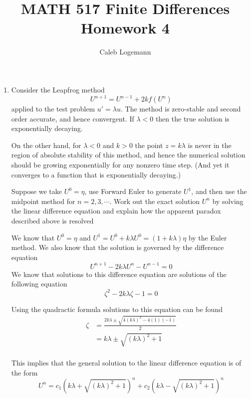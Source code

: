 \documentclass[11pt, oneside, titlepage]{article}
\title{MATH 517 Finite Differences Homework 4}
\author{Caleb Logemann}
\begin{document}
\maketitle

%
\begin{enumerate}
    \item %
        Consider the Leapfrog method
        \[
            U^{n+1} = U^{n-1} + 2k f(U^n)
        \]
        applied to the test problem $u′ = \lambda u$.
        The method is zero-stable and second order accurate, and hence convergent.
        If $\lambda < 0$ then the true solution is exponentially decaying.

        On the other hand, for $\lambda < 0$ and $k > 0$ the point $z = k\lambda$ is never in the
        region of absolute stability of this method,
        and hence the numerical solution should be growing exponentially for any
        nonzero time step.
        (And yet it converges to a function that is exponentially decaying.)

        Suppose we take $U^0 = \eta$, use Forward Euler to generate $U^1$, and
        then use the midpoint method for $n = 2, 3, \cdots$.
        Work out the exact solution $U^n$ by solving the linear difference
        equation and explain how the apparent paradox described above is resolved

        We know that $U^0 = \eta$ and
        $U^1 = U^0 + k \lambda U^0 = (1 + k\lambda)\eta$ by the Euler method.
        We also know that the solution is governed by the difference equation
        \[
            U^{n+1} - 2k\lambda U^n - U^{n-1} = 0
        \]
        We know that solutions to this difference equation are solutions of the
        following equation
        \[
            \zeta^2 - 2k\lambda \zeta - 1 = 0
        \]

        Using the quadractic formula solutions to this equation can be found
        \begin{align*}
            \zeta &= \frac{2k\lambda \pm \sqrt{4(k\lambda)^2 - 4(1)(-1)}}{2} \\
                  &= k\lambda \pm \sqrt{(k\lambda)^2 + 1} \\
        \end{align*}

        This implies that the general solution to the linear difference
        equation is of the form
        \[
            U^n = c_1(k\lambda + \sqrt{(k\lambda)^2 + 1})^n + c_2(k\lambda - \sqrt{(k\lambda)^2 + 1})^n
        \]


\end{enumerate}
\end{document}
